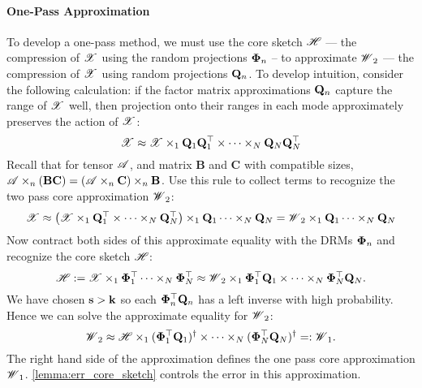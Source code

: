 \paragraph{One-Pass Approximation}
To develop a one-pass method, we must use the core sketch $\T{H}$
--- the compression of $\T{X}$ using the random projections $\mathbf{\Phi}_n$ --
to approximate $\T{W}_2$
--- the compression of $\T{X}$ using random projections $\mathbf{Q}_n$.
%
To develop intuition, consider the following calculation:
if the factor matrix approximations $\mathbf{Q}_n$ capture the range of $\T{X}$ well, then projection onto their ranges in each mode approximately preserves the action of $\T{X}$:
\[
\T{X} \approx \T{X} \times_1 \M{Q}_1 \M{Q}_1^\top \times \cdots \times_N \M{Q}_N \M{Q}_N^\top
\]
Recall that for tensor $\T{A}$, and matrix $\mathbf{B}$ and $\mathbf{C}$ with compatible sizes,
$\T{A} \times_n (\mathbf{B} \mathbf{C}) = (\T{A} \times_n \mathbf{C}) \times_n \mathbf{B}$.
Use this rule to collect terms to recognize the two pass core approximation $\T{W}_2$:
\[
\T{X}
      \approx \left( \T{X} \times_1 \M{Q}_1^\top \times \cdots \times_N \M{Q}_N^\top \right) \times_1 \M{Q}_1 \dots \times_N \M{Q}_N
      = \T{W}_2 \times_1 \M{Q}_1 \dots \times_N \M{Q}_N
\]
Now contract both sides of this approximate equality with the DRMs $\mathbf{\Phi}_n$
and recognize the core sketch $\T{H}$:
\[
\T{H} := \T{X} \times_1 \M{\Phi}_1^\top \dots \times_N \M{\Phi}_N^\top
\approx \T{W}_2 \times_1 \M{\Phi}_1^\top \M{Q}_1 \times \cdots \times_N \M{\Phi}_N^\top \M{Q}_N.
\]
We have chosen $\mathbf{s} > \mathbf{k}$ so each $\mathbf{\Phi}_n^\top \mathbf{Q}_n$ has a left inverse
with high probability. Hence we can solve the approximate equality for $\T{W}_2$: %
\[
\T{W}_2 \approx \T{H} \times_1 (\M{\Phi}_1^\top \M{Q}_1)^\dagger \times \cdots \times_N (\M{\Phi}_N^\top \M{Q}_N)^\dagger =: \T{W}_1.
\]
The right hand side of the approximation defines the one pass core approximation $\T{W}_1$. \ref{lemma:err_core_sketch} controls the error in this approximation.

